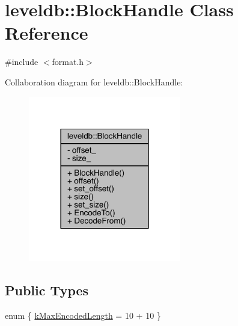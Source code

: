 \hypertarget{classleveldb_1_1_block_handle}{}\section{leveldb\+:\+:Block\+Handle Class Reference}
\label{classleveldb_1_1_block_handle}


{\ttfamily \#include $<$format.\+h$>$}



Collaboration diagram for leveldb\+:\+:Block\+Handle\+:\nopagebreak
\begin{figure}[H]
\begin{center}
\leavevmode
\includegraphics[width=189pt]{classleveldb_1_1_block_handle__coll__graph}
\end{center}
\end{figure}
\subsection*{Public Types}
\begin{DoxyCompactItemize}
\item 
enum \{ \hyperlink{classleveldb_1_1_block_handle_a16cd10ce49c683b8a7971696fc54b3a6aa75d972eb34f4e3618f95d045539dd09}{k\+Max\+Encoded\+Length} = 10 + 10
 \}
\end{DoxyCompactItemize}
